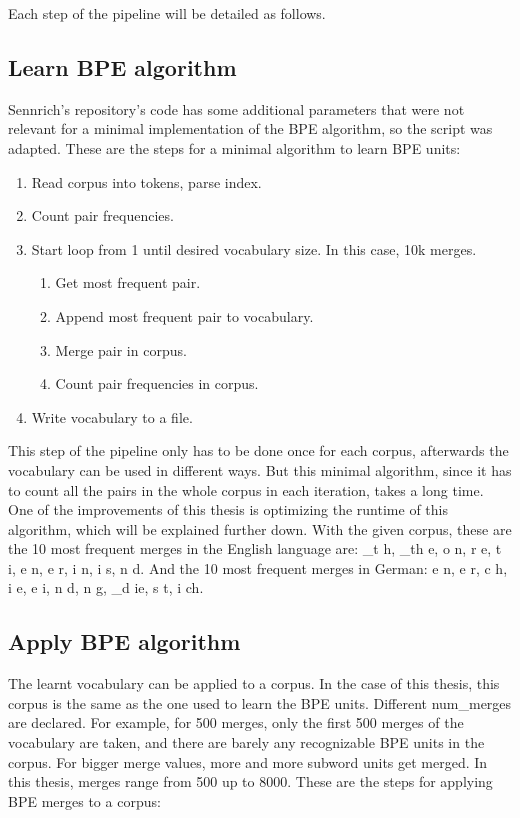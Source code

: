 Each step of the pipeline will be detailed as follows.

\subsection{Learn BPE algorithm}

Sennrich's repository's code has some additional parameters that were not relevant for a minimal implementation of the BPE algorithm, so the script was adapted. These are the steps for a minimal algorithm to learn BPE units:

\begin{enumerate}
	\item Read corpus into tokens, parse index.
	\item Count pair frequencies.
	\item Start loop from 1 until desired vocabulary size. In this case, 10k merges.
	\begin{enumerate}
		\item Get most frequent pair.
		\item Append most frequent pair to vocabulary.
		\item Merge pair in corpus.
		\item Count pair frequencies in corpus.
	\end{enumerate}
	\item Write vocabulary to a file.
\end{enumerate}

This step of the pipeline only has to be done once for each corpus, afterwards the vocabulary can be used in different ways. But this minimal algorithm, since it has to count all the pairs in the whole corpus in each iteration, takes a long time. One of the improvements of this thesis is optimizing the runtime of this algorithm, which will be explained further down. With the given corpus, these are the 10 most frequent merges in the English language are: \_t h, \_th e, o n, r e, t i, e n, e r, i n, i s, n d. And the 10 most frequent merges in German: e n, e r, c h, i e, e i, n d, n g, \_d ie, s t, i ch.

\subsection{Apply BPE algorithm}

The learnt vocabulary can be applied to a corpus. In the case of this thesis, this corpus is the same as the one used to learn the BPE units. Different num\_merges are declared. For example, for 500 merges, only the first 500 merges of the vocabulary are taken, and there are barely any recognizable BPE units in the corpus. For bigger merge values, more and more subword units get merged. In this thesis, merges range from 500 up to 8000. These are the steps for applying BPE merges to a corpus:

